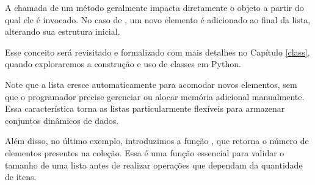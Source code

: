 A chamada de um método geralmente impacta diretamente o objeto a partir do qual ele é invocado.
No caso de , um novo elemento é adicionado ao final da lista, alterando sua estrutura inicial.

Esse conceito será revisitado e formalizado com mais detalhes no Capítulo \ref{class}, quando exploraremos a
construção e uso de classes em Python.

Note que a lista cresce automaticamente para acomodar novos elementos, sem que o programador precise gerenciar ou
alocar memória adicional manualmente.
Essa característica torna as listas particularmente flexíveis para armazenar conjuntos dinâmicos de dados.

Além disso, no último exemplo, introduzimos a função , que retorna o número de elementos presentes na coleção.
Essa é uma função essencial para validar o tamanho de uma lista antes de realizar operações que dependam da quantidade de itens.

